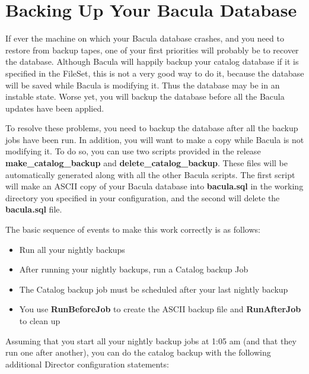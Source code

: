 \label{BackingUpBacula}
\section{Backing Up Your Bacula Database}

If ever the machine on which your Bacula database crashes, and you need to
restore from backup tapes, one of your first priorities will probably be to
recover the database. Although Bacula will happily backup your catalog
database if it is specified in the FileSet, this is not a very good way to do
it, because the database will be saved while Bacula is modifying it. Thus the
database may be in an instable state. Worse yet, you will backup the database
before all the Bacula updates have been applied. 

To resolve these problems, you need to backup the database after all the backup
jobs have been run. In addition, you will want to make a copy while Bacula is
not modifying it. To do so, you can use two scripts provided in the release
{\bf make\_catalog\_backup} and {\bf delete\_catalog\_backup}. These files
will be automatically generated along with all the other Bacula scripts. The
first script will make an ASCII copy of your Bacula database into {\bf
bacula.sql} in the working directory you specified in your configuration, and
the second will delete the {\bf bacula.sql} file. 

The basic sequence of events to make this work correctly is as follows: 

\begin{itemize}
\item Run all your nightly backups  
\item After running your nightly backups, run a Catalog backup Job  
\item The Catalog backup job must be scheduled after your last nightly backup 

\item You use {\bf RunBeforeJob} to create the ASCII  backup file and {\bf
   RunAfterJob} to clean up 
\end{itemize}

Assuming that you start all your nightly backup jobs at 1:05 am (and that they
run one after another), you can do the catalog backup with the following
additional Director configuration statements: 


